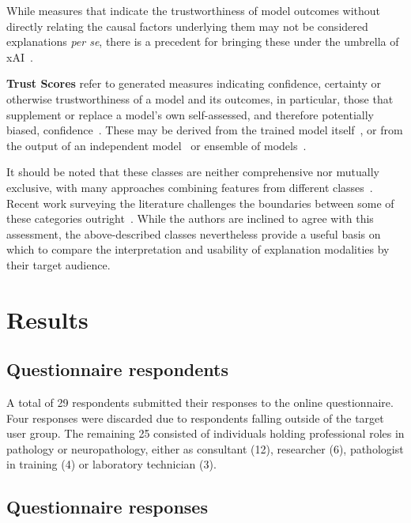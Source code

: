 \documentclass[final,5p,times,twocolumn,hyphens]{elsarticle}
\begin{document}
While measures that indicate the trustworthiness of model outcomes without directly relating the causal factors underlying them may not be considered explanations \textit{per se}, there is a precedent for bringing these under the umbrella of xAI~\cite{poceviciute_survey_2020, lin2019explanations}.

\textbf{Trust Scores} refer to generated measures indicating confidence, certainty or otherwise trustworthiness of a model and its outcomes, in particular, those that supplement or replace a model's own self-assessed, and therefore potentially biased, confidence~\cite{jiang2018trust, wang2021ai}. These may be derived from the trained model itself~\cite{tagasovska2019single}, or from the output of an independent model~\cite{jiang2018trust} or ensemble of models~\cite{pearce2018high}.

It should be noted that these classes are neither comprehensive nor mutually exclusive, with many approaches combining features from different classes~\cite{kim2016examples,liu2019generative}. Recent work surveying the literature challenges the boundaries between some of these categories outright~\cite{zhang2021survey}. While the authors are inclined to agree with this assessment, the above-described classes nevertheless provide a useful basis on which to compare the interpretation and usability of explanation modalities by their target audience.

\section{Results}
\label{sec:results}

\subsection{Questionnaire respondents}

A total of 29 respondents submitted their responses to the online questionnaire. Four responses were discarded due to respondents falling outside of the target user group. The remaining 25 consisted of individuals holding professional roles in pathology or neuropathology, either as consultant (12), researcher (6), pathologist in training (4) or laboratory technician (3). 

\subsection{Questionnaire responses}
\end{document}
